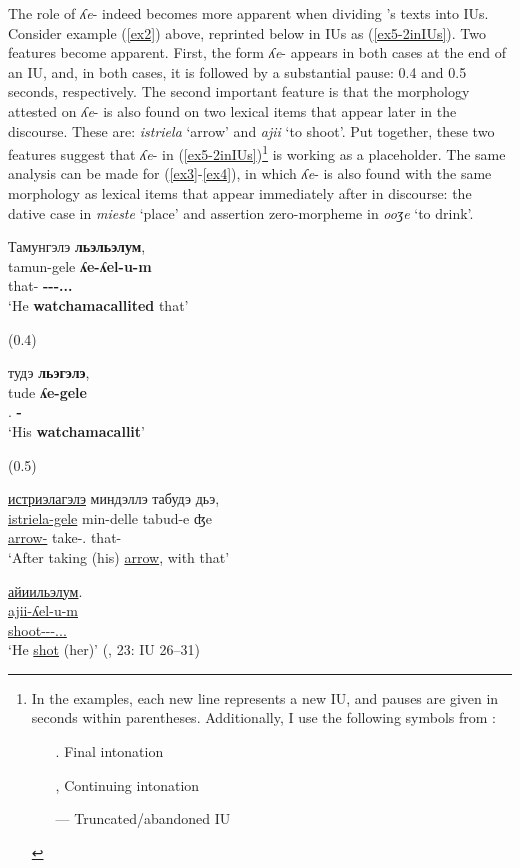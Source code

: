 \documentclass[output=paper,colorlinks,citecolor=brown
\ChapterDOI{10.5281/zenodo.15697581}
]{langscibook}
\begin{document}
The role of \textit{ʎe}- indeed becomes more apparent when dividing \citet{Nikolaeva_Mayer2004}'s texts into IUs. 
Consider example (\ref{ex2}) above, reprinted below in IUs as (\ref{ex5-2inIUs}). 
Two features become apparent. 
First, the form \textit{ʎe}- appears in both cases at the end of an IU, and, in both cases, it is followed by a substantial pause: 0.4 and 0.5 seconds, respectively. 
The second important feature is that the morphology attested on \textit{ʎe}- is also found on two lexical items that appear later in the discourse. 
These are: \textit{istriela} `arrow' and \textit{ajii} `to shoot'. 
Put together, these two features suggest that \textit{ʎe}- in (\ref{ex5-2inIUs})\footnote{In the examples, each new line represents a new IU, and pauses are given in seconds within parentheses. Additionally, I use the following symbols from \citet{DuBoisetal1993}:
\begin{itemize}
\setlength\itemsep{0em}
\item[.] Final intonation
\item[,] Continuing intonation
\item[—] Truncated/abandoned IU
\end{itemize}
} is working as a placeholder. 
The same analysis can be made for (\ref{ex3}-\ref{ex4}), in which \textit{ʎe}- is also found with the same morphology as lexical items that appear immediately after in discourse: the dative case in \textit{mieste} `place' and assertion zero-morpheme in \textit{ooʒe} `to drink'.

\begin{exe}
\ex \label{ex5-2inIUs}
   \glll Тамунгэлэ \textbf{льэльэлум}, \\
    tamun-gele \textbf{ʎe-ʎel-u-m} \\
    that-\Acc{} \textbf{\Ph-\Ev-\Ep-\Ass.\Tr.\Ef.\Tsg{}} \\
    \glt `He \textbf{watchamacallited} that'

\sn (0.4)

\sn
   \glll тудэ \textbf{льэгэлэ}, \\
    tude \textbf{ʎe-gele} \\
    \Tsg.\Gen{} \textbf{\Ph-\Acc{}} \\
    \glt `His \textbf{watchamacallit}'

\sn (0.5)

\sn 
 \glll \uline{истриэлагэлэ} миндэллэ табудэ дьэ, \\
    \uline{istriela-gele} min-delle tabud-e ʤe \\
    \uline{arrow-\Acc{}} take-\Cvb.\Seq{} that-\Ins{} \Dp{} \\
    \glt `After taking (his) \uline{arrow}, with that'

\sn
 \glll \uline{айиильэлум}. \\
    \uline{ajii-ʎel-u-m} \\
    \uline{shoot-\Ev-\Ep-\Ass.\Tr.\Ef.\Tsg{}}  \\
    \glt `He \uline{shot} (her)' \hfill (\citealt{Nikolaeva_Mayer2004}, 23: IU 26--31)

\end{exe}
\end{document}
